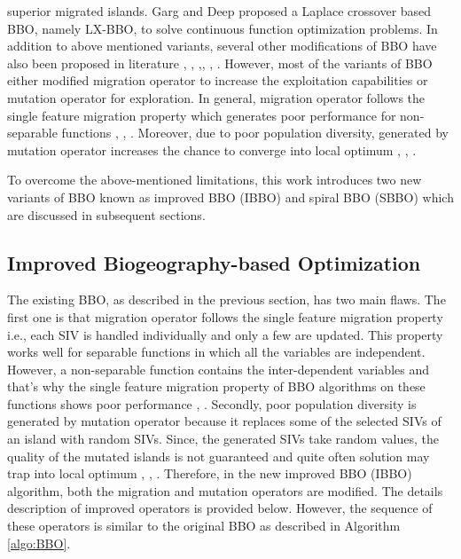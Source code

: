 superior migrated islands.  Garg and Deep \cite{Garg2016} proposed a Laplace crossover based BBO, namely LX-BBO, to solve continuous function optimization problems. In addition to above mentioned variants, several other modifications of BBO have also been proposed in literature \cite{saremi2014}, \cite{feng2014}, \cite{zheng2014},\cite{guo2015},  \cite{bansal2016}, \cite{ma2017}. However, most of the variants of BBO either modified migration operator to increase the exploitation capabilities or mutation operator for exploration. In general, migration operator follows the single feature migration property which generates poor performance for non-separable functions \cite{Simon2008}, \cite{gonge2010}, \cite{simon2014}. Moreover, due to poor population diversity, generated by mutation operator increases the chance to converge into local optimum \cite{Simon2008}, \cite{ma2011}, \cite{ma2013}. 


To overcome the above-mentioned limitations, this work introduces two new variants of BBO known as improved BBO (IBBO) and spiral BBO (SBBO) which are discussed in subsequent sections.
 
\subsection{Improved Biogeography-based Optimization} 
  
The existing BBO, as described in the previous section, has two main flaws. The first one is that migration operator follows the single feature migration property i.e., each SIV is handled individually and only a few are updated. This property works well for separable functions in which all the variables are independent. However, a non-separable function contains the inter-dependent variables and that’s why the single feature migration property of BBO algorithms on these functions shows poor performance \cite{simon2014}, \cite{chen2016}.  Secondly, poor population diversity is generated by mutation operator because it replaces some of the selected SIVs of an island with random SIVs. Since, the generated SIVs take random values, the quality of the mutated islands is not guaranteed and quite often solution may trap into local optimum \cite{lim2016}, \cite{ma2011}, \cite{ma2013}. Therefore, in the new improved BBO (IBBO) algorithm, both the migration and mutation operators are modified. The details description of improved operators is provided below. However, the sequence of these operators is similar to the original BBO as described in Algorithm \ref{algo:BBO}.

